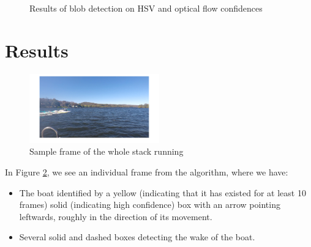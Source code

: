 \documentclass{article}
\begin{document}
\begin{figure}
\hfill
{}
\hfill
{}
\hfill
\caption{Results of blob detection on HSV and optical flow confidences}
\label{fig:blobs}
\end{figure}

\section{Results}

\begin{figure}
\centering
\includegraphics[width=0.5\textwidth]{example_detection}
\caption{Sample frame of the whole stack running}
\label{fig:example_detection}
\end{figure}

In Figure \ref{fig:example_detection}, we see an individual frame from the
algorithm, where we have:
\begin{itemize}
\item The boat identified by a yellow (indicating that it has existed for at
      least 10 frames) solid (indicating high confidence) box with an arrow
      pointing leftwards, roughly in the direction of its movement.
\item Several solid and dashed boxes detecting the wake of the boat.
\end{itemize}
\end{document}
